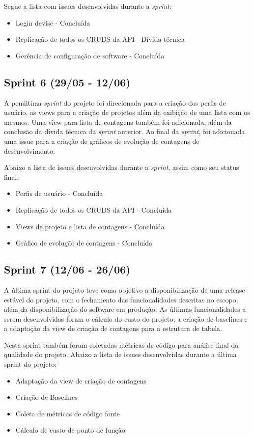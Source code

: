 Segue a lista com issues desenvolvidas durante a \textit{sprint}:

\begin{itemize}
  \item Login devise - Concluída
  \item Replicação de todos os CRUDS da API - Dívida técnica
  \item Gerência de configuração de software - Concluída
\end{itemize}

\subsection{Sprint 6 (29/05 - 12/06)}

A penúltima \textit{sprint} do projeto foi direcionada para a criação dos perfis de usuário, as views para a criação de projetos além da exibição de uma lista com os mesmos. Uma view para  lista de contagens também foi adicionada, além da conclusão da dívida técnica da \textit{sprint} anterior. Ao final da \textit{sprint}, foi adicionada uma issue para a criação de gráficos de evolução de contagens de desenvolvimento.

Abaixo a lista de issues desenvolvidas durante a \textit{sprint}, assim como seu status final:

\begin{itemize}
  \item Perfis de usuário - Concluída
  \item Replicação de todos os CRUDS da API - Concluída
  \item Views de projeto e lista de contagens - Concluída
  \item Gráfico de evolução de contagens - Concluída
\end{itemize}

\subsection{Sprint 7 (12/06 - 26/06)}

A última sprint do projeto teve como objetivo a disponibilização de uma release estável do projeto, com o fechamento das funcionalidades descritas no escopo, além da disponibilização do software em produção. As últimas funcionalidades a serem desenvolvidas foram o cálculo do custo do projeto, a criação de baselines e a adaptação da view de criação de contagens para a estrutura de tabela.

Nesta sprint  também foram coletadas métricas de código para análise final da qualidade do projeto. Abaixo a lista de issues desenvolvidas durante a última sprint do projeto:

\begin{itemize}
  \item Adaptação da view de criação de contagens
  \item Criação de Baselines
  \item Coleta de métricas de código fonte
  \item Cálculo de custo de ponto de função
\end{itemize}
